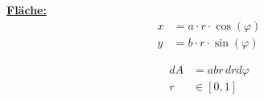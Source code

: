    \begin{minipage}{0.49\linewidth}
        \textbf{\underline{Fläche:}}
            \begin{align*}
                x &= a \cdot r \cdot \cos(\varphi)\\
                y &= b \cdot r \cdot \sin(\varphi)
            \end{align*}
    \end{minipage}
    \begin{minipage}{0.45\linewidth}
        \vspace{0.8em}
        \begin{align*}
            dA &= abr \, dr d\varphi\\
            r &\in [0,1]
        \end{align*}
    \end{minipage}
        